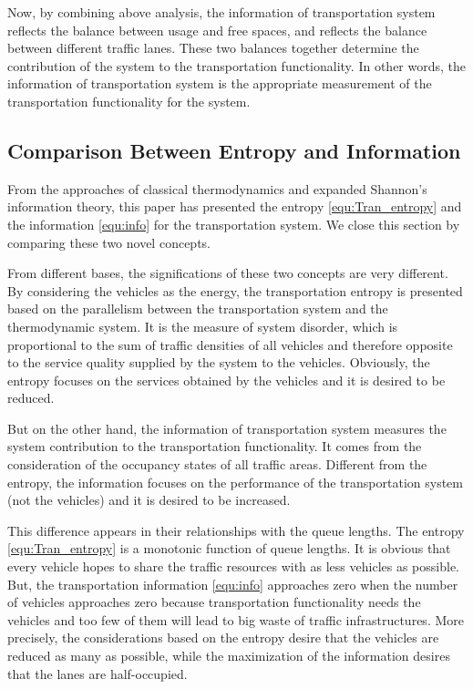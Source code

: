 \documentclass[preprint,authoryear,12pt]{elsarticle}
\begin{document}

Now, by combining above analysis, the information of transportation system reflects the balance between usage and free spaces, and reflects the balance between different traffic lanes. These two balances together determine the contribution of the system to the transportation functionality. In other words, the information of transportation system is the appropriate measurement of the transportation functionality for the system.

\subsection{Comparison Between Entropy and Information}


From the approaches of classical thermodynamics and expanded Shannon's information theory, this paper has presented the entropy \eqref{equ:Tran_entropy} and the information \eqref{equ:info} for the transportation system. We close this section by comparing these two novel concepts.

From different bases, the significations of these two concepts are very different. By considering the vehicles as the energy, the transportation entropy is presented based on the parallelism between the transportation system and the thermodynamic system. It is the measure of system disorder, which is proportional to the sum of traffic densities of all vehicles and therefore opposite to the service quality supplied by the system to the vehicles. Obviously, the entropy focuses on the services obtained by the vehicles and it is desired to be reduced.

But on the other hand, the information of transportation system measures the system contribution to the transportation functionality. It comes from the consideration of the occupancy states of all traffic areas. Different from the entropy, the information focuses on the performance of the transportation system (not the vehicles) and it is desired to be increased.

This difference appears in their relationships with the queue lengths. The entropy \eqref{equ:Tran_entropy} is a monotonic function of queue lengths. It is obvious that every vehicle hopes to share the traffic resources with as less vehicles as possible. But, the transportation information \eqref{equ:info} approaches zero when the number of vehicles approaches zero because transportation functionality needs the vehicles and too few of them will lead to big waste of traffic infrastructures. More precisely, the considerations based on the entropy desire that the vehicles are reduced as many as possible, while the maximization of the information desires that the lanes are half-occupied.
\end{document}
